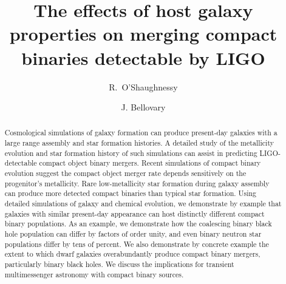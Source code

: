 \documentclass[nofootinbib,twocolumn,prd]{emulateapj}
\newcommand\jillianremark[1]{{\color{blue}#1}}
\begin{document}
\title{The effects of host galaxy properties on merging compact binaries detectable by LIGO}
\author{R.\ O'Shaughnessy}
\author{ J. Bellovary}
\begin{abstract}
Cosmological simulations of galaxy formation can produce present-day galaxies with a large range assembly and star formation histories.  A detailed study of the metallicity evolution and star formation history of such simulations can assist in predicting LIGO-detectable compact object binary mergers.
Recent simulations of compact binary evolution suggest the compact object merger rate depends
sensitively on the progenitor's metallicity.  Rare low-metallicity star formation during galaxy
assembly can produce more detected compact binaries than typical star formation.   
Using detailed simulations of galaxy and chemical evolution, we demonstrate by example that galaxies with similar present-day appearance can host distinctly different
compact binary populations.  As an example, we demonstrate how the coalescing binary black hole population can differ by
factors of order  unity, and even binary neutron star populations differ by tens of percent.  
%
We also demonstrate by concrete example the extent to which dwarf galaxies overabundantly produce compact binary
mergers, particularly binary black holes. 
We discuss the implications for transient multimessenger astronomy with compact binary sources. 

\end{abstract}
\end{document}

